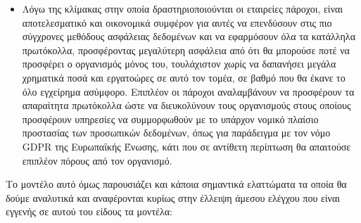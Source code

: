 \documentclass{article}
\begin{document}
\begin{itemize}
\item Λόγω της κλίμακας στην οποία δραστηριοποιούνται οι εταιρείες πάροχοι, είναι αποτελεσματικό και οικονομικά συμφέρον για αυτές να επενδύσουν στις πιο σύγχρονες μεθόδους ασφάλειας δεδομένων και να εφαρμόσουν όλα τα κατάλληλα πρωτόκολλα, προσφέροντας μεγαλύτερη ασφάλεια από ότι θα μπορούσε ποτέ να προσφέρει ο οργανισμός μόνος του, τουλάχιστον χωρίς να δαπανήσει μεγάλα χρηματικά ποσά και εργατοώρες σε αυτό τον τομέα, σε βαθμό που θα έκανε το όλο εγχείρημα ασύμφορο. Επιπλέον οι πάροχοι αναλαμβάνουν να προσφέρουν τα απαραίτητα πρωτόκολλα ώστε να διευκολύνουν τους οργανισμούς στους οποίους προσφέρουν υπηρεσίες να συμμορφωθούν με το υπάρχον νομικό πλαίσιο προστασίας των προσωπικών δεδομένων, όπως για παράδειγμα με τον νόμο GDPR της Ευρωπαϊκής Ένωσης, κάτι που σε αντίθετη περίπτωση θα απαιτούσε επιπλέον πόρους από τον οργανισμό.
\end{itemize}
Το μοντέλο αυτό όμως παρουσιάζει και κάποια σημαντικά ελαττώματα τα οποία θα δούμε αναλυτικά και αναφέρονται κυρίως στην έλλειψη άμεσου ελέγχου που είναι εγγενής σε αυτού του είδους τα μοντέλα:
\end{document}
